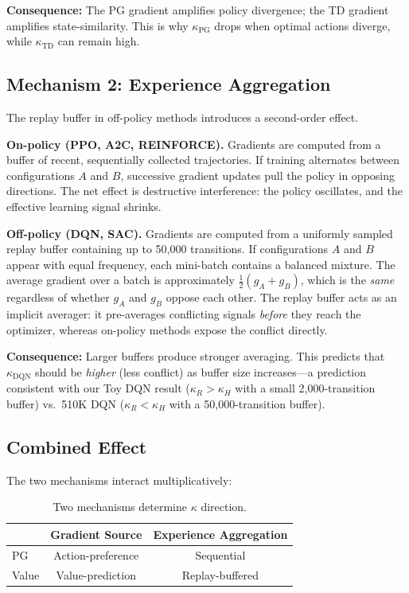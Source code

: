 \documentclass[letterpaper]{article}
\begin{document}
\textbf{Consequence:} The PG gradient amplifies policy divergence; the TD gradient amplifies state-similarity. This is why $\kappa_{\text{PG}}$ drops when optimal actions diverge, while $\kappa_{\text{TD}}$ can remain high.

\subsection{Mechanism 2: Experience Aggregation}

The replay buffer in off-policy methods introduces a second-order effect.

\medskip
\noindent\textbf{On-policy (PPO, A2C, REINFORCE).}
Gradients are computed from a buffer of recent, sequentially collected trajectories.
If training alternates between configurations $A$ and $B$, successive gradient updates pull the policy in opposing directions.
The net effect is destructive interference: the policy oscillates, and the effective learning signal shrinks.

\medskip
\noindent\textbf{Off-policy (DQN, SAC).}
Gradients are computed from a uniformly sampled replay buffer containing up to 50,000 transitions.
If configurations $A$ and $B$ appear with equal frequency, each mini-batch contains a balanced mixture.
The average gradient over a batch is approximately $\frac{1}{2}(g_A + g_B)$, which is the \textit{same} regardless of whether $g_A$ and $g_B$ oppose each other.
The replay buffer acts as an implicit averager: it pre-averages conflicting signals \textit{before} they reach the optimizer, whereas on-policy methods expose the conflict directly.

\textbf{Consequence:} Larger buffers produce stronger averaging. This predicts that $\kappa_{\text{DQN}}$ should be \textit{higher} (less conflict) as buffer size increases---a prediction consistent with our Toy DQN result ($\kappa_R \!>\! \kappa_H$ with a small 2,000-transition buffer) vs.\ 510K DQN ($\kappa_R \!<\! \kappa_H$ with a 50,000-transition buffer).

\subsection{Combined Effect}

The two mechanisms interact multiplicatively:

\begin{table}[h]
\centering
\small
\begin{tabular}{lcc}
\toprule
& Gradient Source & Experience Aggregation \\
\midrule
PG    & Action-preference & Sequential \\
Value & Value-prediction & Replay-buffered \\
\bottomrule
\end{tabular}
\caption{Two mechanisms determine $\kappa$ direction.}
\end{table}
\end{document}
